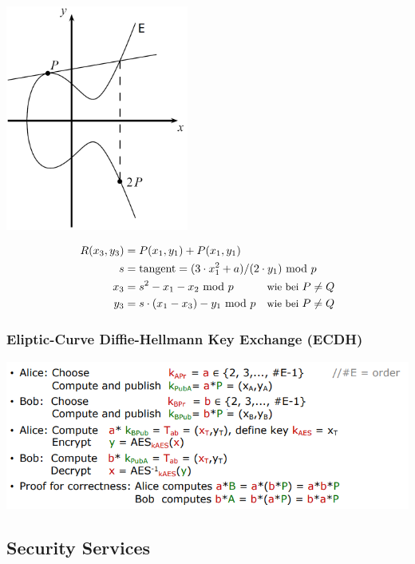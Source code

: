 \documentclass[
  10pt,
  a4paper,
]{article}
\begin{document}
\begin{multicols*}{2}
\begin{center}
\includegraphics[width=6cm,height=\textheight]{images/crypto/image-23.png}
\end{center}

\[
\begin{split}
R(x_3,y_3) &= P(x_1,y_1) + P(x_1,y_1)\\
s &= \text{tangent} = (3\cdot x_1^2+a)/(2\cdot y_1) ~\text{mod}~ p\\
x_3 &= s^2-x_1-x_2 ~\text{mod}~ p \quad\qquad {\small\text{wie bei } P\neq Q}\\
y_3 &= s\cdot (x_1-x_3)-y_1 ~\text{mod}~ p \quad {\small\text{wie bei } P\neq Q}\\
\end{split}
\]

\subsubsection{Eliptic-Curve Diffie-Hellmann Key Exchange
(ECDH)}\label{eliptic-curve-diffie-hellmann-key-exchange-ecdh}

\includegraphics{images/crypto/image-24.png}

\subsection{Security Services}\label{security-services}


\end{multicols*}
\end{document}
